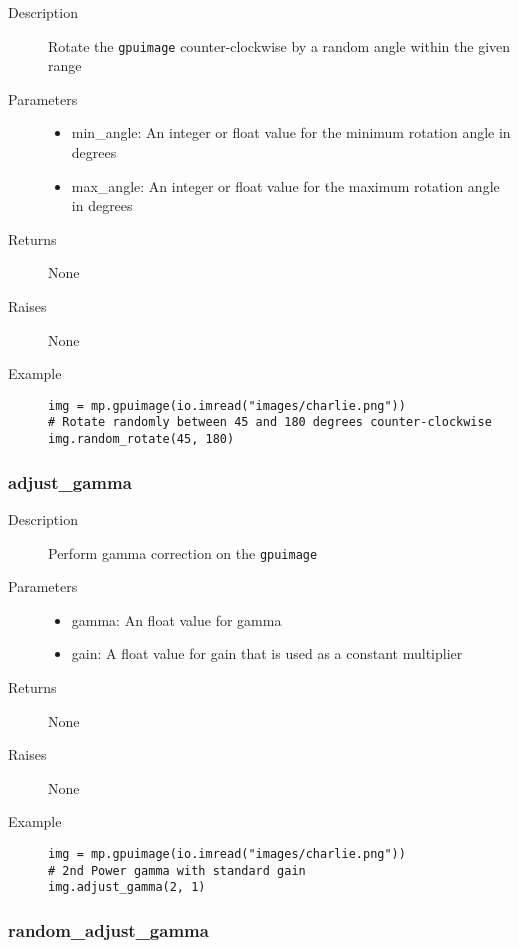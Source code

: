 \begin{description}
   \item[Description] Rotate the \verb|gpuimage| counter-clockwise by a random angle within the given range
   \item[Parameters] \phantom{}
   \begin{itemize}
   \item min\_angle: An integer or float value for the minimum rotation angle in degrees
   \item max\_angle: An integer or float value for the maximum rotation angle in degrees
   \end{itemize}
   \item[Returns] None
   \item[Raises] None
   \item[Example] \phantom{}
   \begin{lstlisting}
img = mp.gpuimage(io.imread("images/charlie.png"))
# Rotate randomly between 45 and 180 degrees counter-clockwise
img.random_rotate(45, 180)
\end{lstlisting}
\end{description}

\subsubsection{adjust\_gamma}

\begin{description}
   \item[Description] Perform gamma correction on the \verb|gpuimage|
   \item[Parameters] \phantom{}
   \begin{itemize}
   \item gamma: An float value for gamma
   \item gain: A float value for gain that is used as a constant multiplier
   \end{itemize}
   \item[Returns] None
   \item[Raises] None
   \item[Example] \phantom{}
   \begin{lstlisting}
img = mp.gpuimage(io.imread("images/charlie.png"))
# 2nd Power gamma with standard gain
img.adjust_gamma(2, 1)
\end{lstlisting}
\end{description}

\subsubsection{random\_adjust\_gamma}

